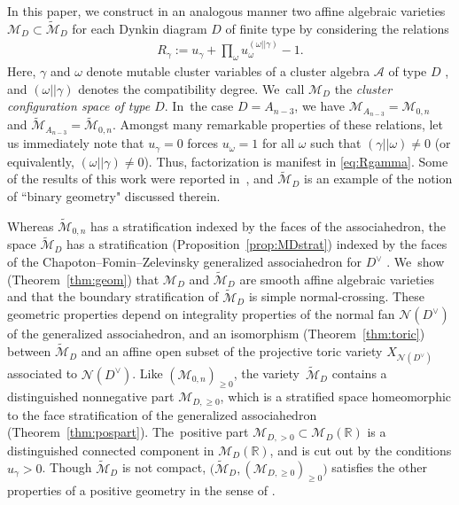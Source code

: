\documentclass[pdftex]{sigma}%
\def\R{{\mathbb R}}
\def\A{{\mathcal{A}}}
\def\M{{\mathcal{M}}}
\def\tM{{\widetilde {\mathcal{M}}}}
\def\N{{\mathcal{N}}}
\numberwithin{equation}{section}
\begin{document}
\bigskip{} In this paper, we construct in an analogous manner two affine algebraic varieties \mbox{$\M_D \!\subset\! \tM_{D}$} for each Dynkin diagram $D$ of finite type by considering the relations
\begin{gather}\label{eq:Rgamma}
R_\gamma := u_\gamma + \prod_{\omega} u_\omega^{(\omega || \gamma)} - 1.
\end{gather}
Here, $\gamma$ and $\omega$ denote mutable cluster variables of a cluster algebra $\A$ of type $D$ \cite{CA2}, and $(\omega || \gamma)$ denotes the compatibility degree. We~call $\M_D$ the \emph{cluster configuration space of type $D$}. In~the case $D = A_{n-3}$, we have $\M_{A_{n-3}} = \M_{0,n}$ and $\tM_{A_{n-3}} = \tM_{0,n}$. Amongst many remarkable properties of these relations, let us immediately note that $u_\gamma = 0$ forces $u_\omega = 1$ for all $\omega$ such that $(\gamma||\omega) \neq 0$ (or equivalently, $(\omega||\gamma)\neq0$). Thus, factorization is manifest in \eqref{eq:Rgamma}. Some of the results of this work were reported in~\cite{AHLT}, and $\tM_D$ is an example of the notion of ``binary geometry" discussed therein.

Whereas $\tM_{0,n}$ has a stratification indexed by the faces of the associahedron, the space $\tM_D$ has a stratification (Proposition~\ref{prop:MDstrat}) indexed by the faces of the Chapoton--Fomin--Zelevinsky generalized associahedron for $D^\vee$ \cite{CFZ,FZY}. We~show (Theorem~\ref{thm:geom}) that $\M_D$ and $\tM_D$ are smooth affine algebraic varieties and that the boundary stratification of $\tM_D$ is simple normal-crossing. These geometric properties depend on integrality properties of the normal fan $\N(D^\vee)$ of the generalized associahedron, and an isomorphism (Theorem~\ref{thm:toric}) between $\tM_D$ and an affine open subset of the projective toric variety $X_{\N(D^\vee)}$ associated to $\N(D^\vee)$. Like $(\M_{0,n})_{\geq 0}$, the variety~$\tM_D$ contains a distinguished nonnegative part $\M_{D,\geq 0}$, which is a stratified space homeomorphic to the face stratification of the generalized associahedron (Theorem~\ref{thm:pospart}). The~positive part $\M_{D, > 0} \subset \M_D(\R)$ is a distinguished connected component in $\M_D(\R)$, and is cut out by the conditions $u_\gamma >0$. Though $\tM_D$ is not compact, $\big(\tM_D,(\M_{D, \geq 0})_{\geq 0}\big)$ satisfies the other properties of a positive geometry in the sense of \cite{ABL}.
\end{document}
